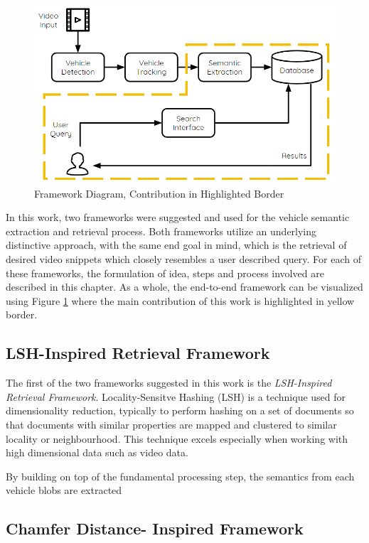 \begin{figure}[hbt!]\centering
\includegraphics[width=.9\textwidth]{image/framework_new.PNG}
\caption{Framework Diagram, Contribution in Highlighted Border}
\label{fig:framework}
\end{figure}


In this work, two frameworks were suggested and used for the vehicle semantic extraction and retrieval process. Both frameworks utilize an underlying distinctive approach, with the same end goal in mind, which is the retrieval of desired video snippets which closely resembles a user described query. For each of these frameworks, the formulation of idea, steps and process involved are described in this chapter. 
As a whole, the end-to-end framework can be visualized using Figure \ref{fig:framework} where the main contribution of this work is highlighted in yellow border. 

\subsection{LSH-Inspired Retrieval Framework}
The first of the two frameworks suggested in this work is the \textit{LSH-Inspired Retrieval Framework}. Locality-Sensitve Hashing (LSH) is a technique used for dimensionality reduction, typically to perform hashing on a set of documents so that documents with similar properties are mapped and clustered to similar locality or neighbourhood. This technique excels especially when working with high dimensional data such as video data.

By building on top of the fundamental processing step, the semantics from each vehicle blobs are extracted

\subsection{Chamfer Distance- Inspired Framework}










